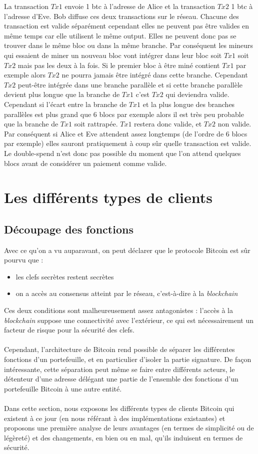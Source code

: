 \documentclass[11pt,a4paper]{article}
\begin{document}
La transaction $Tx1$ envoie 1 btc à l'adresse de Alice et la transaction $Tx2$ 1 btc à l'adresse d'Eve. Bob diffuse ces deux transactions sur le réseau. Chacune des transaction est valide séparément cependant elles ne peuvent pas être valides en même temps car elle utilisent le même output. Elles ne peuvent donc pas se trouver dans le même bloc ou dans la même branche. Par conséquent les mineurs qui essaient de miner un nouveau bloc vont intégrer dans leur bloc soit $Tx1$ soit $Tx2$ mais pas les deux à la fois. Si le premier bloc à être miné contient $Tx1$ par exemple alors $Tx2$ ne pourra jamais être intégré dans cette branche. Cependant $Tx2$ peut-être intégrée dans une branche parallèle et si cette branche parallèle devient plus longue que la branche de $Tx1$ c'est $Tx2$ qui deviendra valide. Cependant si l'écart entre la branche de $Tx1$ et la plus longue des branches parallèles est plus grand que 6 blocs par exemple alors il est très peu probable que la branche de $Tx1$ soit rattrapée. $Tx1$ restera donc valide, et $Tx2$ non valide. Par conséquent si Alice et Eve attendent assez longtemps (de l'ordre de 6 blocs par exemple) elles sauront pratiquement à coup sûr quelle transaction est valide. Le double-spend n'est donc pas possible du moment que l'on attend quelques blocs avant de considérer un paiement comme valide.

\section{Les différents types de clients}
\subsection{Découpage des fonctions}
Avec ce qu'on a vu auparavant, on peut déclarer que le protocole Bitcoin est sûr pourvu que :\begin{itemize}
	\item les clefs secrètes restent secrètes
	\item on a accès au consensus atteint par le réseau, c'est-à-dire à la \textit{blockchain}
\end{itemize}
Ces deux conditions sont malheureusement assez antagonistes : l'accès à la \textit{blockchain} suppose une connectivité avec l'extérieur, ce qui est nécessairement un facteur de risque pour la sécurité des clefs.\\\\
Cependant, l'architecture de Bitcoin rend possible de séparer les différentes fonctions d'un portefeuille, et en particulier d'isoler la partie signature. De façon intéressante, cette séparation peut même se faire entre différents acteurs, le détenteur d'une adresse délégant une partie de l'ensemble des fonctions d'un portefeuille Bitcoin à une autre entité.\\\\
Dans cette section, nous exposons les différents types de clients Bitcoin qui existent à ce jour (en nous référant à des implémentations existantes) et proposons une première analyse de leurs avantages (en termes de simplicité ou de légèreté) et des changements, en bien ou en mal, qu'ils induisent en termes de sécurité.
\end{document}
